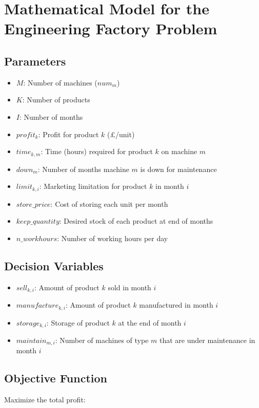 \documentclass{article}
\begin{document}
\section*{Mathematical Model for the Engineering Factory Problem}

\subsection*{Parameters}

\begin{itemize}
    \item $M$: Number of machines ($num_{m}$)
    \item $K$: Number of products
    \item $I$: Number of months
    \item $profit_k$: Profit for product $k$ (£/unit)
    \item $time_{k,m}$: Time (hours) required for product $k$ on machine $m$
    \item $down_m$: Number of months machine $m$ is down for maintenance
    \item $limit_{k,i}$: Marketing limitation for product $k$ in month $i$
    \item $store\_price$: Cost of storing each unit per month
    \item $keep\_quantity$: Desired stock of each product at end of months
    \item $n\_workhours$: Number of working hours per day
\end{itemize}

\subsection*{Decision Variables}
\begin{itemize}
    \item $sell_{k,i}$: Amount of product $k$ sold in month $i$
    \item $manufacture_{k,i}$: Amount of product $k$ manufactured in month $i$
    \item $storage_{k,i}$: Storage of product $k$ at the end of month $i$
    \item $maintain_{m,i}$: Number of machines of type $m$ that are under maintenance in month $i$
\end{itemize}

\subsection*{Objective Function}
Maximize the total profit:
\end{document}
